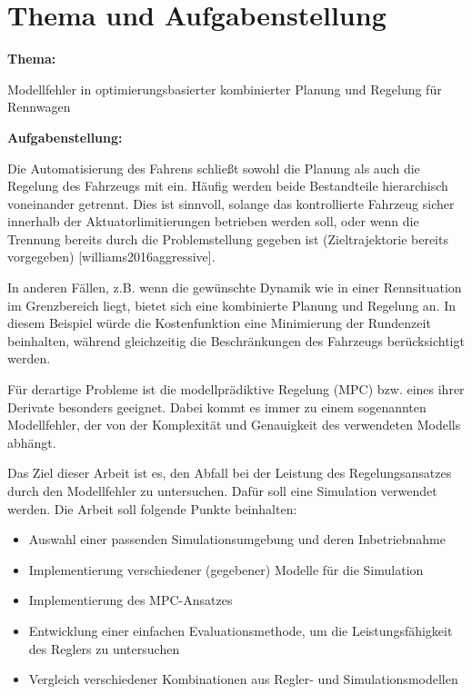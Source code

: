 

\chapter*{Thema und Aufgabenstellung}
\textbf{Thema:}\par\smallskip

 Modellfehler in optimierungsbasierter kombinierter Planung und Regelung für Rennwagen

\par\bigskip
\textbf{Aufgabenstellung:}\par\smallskip
\par\smallskip  
Die Automatisierung des Fahrens schließt sowohl die Planung als auch die Regelung des Fahrzeugs mit ein. Häufig werden beide Bestandteile hierarchisch voneinander getrennt. Dies ist sinnvoll, solange das kontrollierte Fahrzeug sicher innerhalb der Aktuatorlimitierungen betrieben werden soll, oder wenn die Trennung bereits durch die Problemstellung gegeben ist (Zieltrajektorie bereits vorgegeben) [williams2016aggressive].  

In anderen Fällen, z.B. wenn die gewünschte Dynamik wie in einer Rennsituation im Grenzbereich liegt, bietet sich eine kombinierte Planung und Regelung an. In diesem Beispiel würde die Kostenfunktion eine Minimierung der Rundenzeit beinhalten, während gleichzeitig die Beschränkungen des Fahrzeugs berücksichtigt werden.

Für derartige Probleme ist die modellprädiktive Regelung (MPC) bzw. eines ihrer Derivate besonders geeignet. Dabei kommt es immer zu einem sogenannten Modellfehler, der von der Komplexität und Genauigkeit des verwendeten Modells abhängt.

Das Ziel dieser Arbeit ist es, den Abfall bei der Leistung des Regelungsansatzes durch den Modellfehler zu untersuchen. Dafür soll eine Simulation verwendet werden.
Die Arbeit soll folgende Punkte beinhalten:
\begin{itemize}
\item Auswahl einer passenden Simulationsumgebung und deren Inbetriebnahme
\item Implementierung verschiedener (gegebener) Modelle für die Simulation
\item Implementierung des MPC-Ansatzes
\item Entwicklung einer einfachen Evaluationsmethode, um die Leistungsfähigkeit des Reglers zu untersuchen
\item Vergleich verschiedener Kombinationen aus Regler- und Simulationsmodellen
\end{itemize}